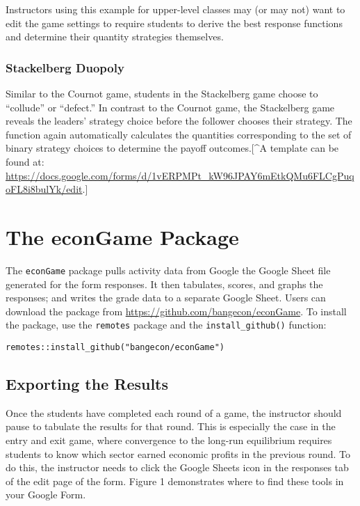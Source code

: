 \documentclass[
]{article}
\begin{document}
Instructors using this example for upper-level classes may (or may not)
want to edit the game settings to require students to derive the best
response functions and determine their quantity strategies themselves.

\hypertarget{stackelberg-duopoly}{%
\subsubsection{Stackelberg Duopoly}\label{stackelberg-duopoly}}

Similar to the Cournot game, students in the Stackelberg game choose to
``collude'' or ``defect.'' In contrast to the Cournot game, the
Stackelberg game reveals the leaders' strategy choice before the
follower chooses their strategy. The function again automatically
calculates the quantities corresponding to the set of binary strategy
choices to determine the payoff outcomes.{[}\^{}A template can be found
at:
\url{https://docs.google.com/forms/d/1vERPMPt_kW96JPAY6mEtkQMu6FLCgPuqoFL8i8bulYk/edit}.{]}

\hypertarget{the-econgame-package}{%
\section{The econGame Package}\label{the-econgame-package}}

The \texttt{econGame} package pulls activity data from Google the Google
Sheet file generated for the form responses. It then tabulates, scores,
and graphs the responses; and writes the grade data to a separate Google
Sheet. Users can download the package from
\url{https://github.com/bangecon/econGame}. To install the package, use
the \texttt{remotes} package and the \texttt{install\_github()}
function:

\texttt{remotes::install\_github("bangecon/econGame")}

\hypertarget{exporting-the-results}{%
\subsection{Exporting the Results}\label{exporting-the-results}}

Once the students have completed each round of a game, the instructor
should pause to tabulate the results for that round. This is especially
the case in the entry and exit game, where convergence to the long-run
equilibrium requires students to know which sector earned economic
profits in the previous round. To do this, the instructor needs to click
the Google Sheets icon in the responses tab of the edit page of the
form. Figure 1 demonstrates where to find these tools in your Google
Form.
\end{document}
